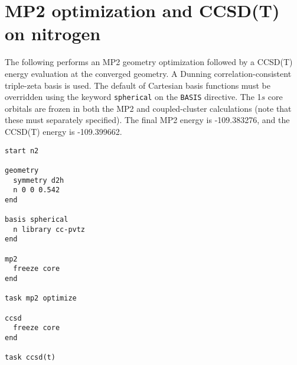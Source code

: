 \section{MP2 optimization and CCSD(T) on nitrogen}

The following performs an MP2 geometry optimization followed by a
CCSD(T) energy evaluation at the converged geometry.  A Dunning
correlation-consistent triple-zeta basis is used.  The default of
Cartesian basis functions must be overridden using the keyword
\verb+spherical+ on the \verb+BASIS+ directive. The 1$s$ core
orbitals are frozen in both the MP2 and coupled-cluster calculations
(note that these must separately specified).  The final MP2 energy is
-109.383276, and the CCSD(T) energy is -109.399662.

\begin{verbatim}
start n2

geometry
  symmetry d2h
  n 0 0 0.542
end

basis spherical
  n library cc-pvtz
end

mp2
  freeze core
end

task mp2 optimize

ccsd
  freeze core
end

task ccsd(t)
\end{verbatim}

